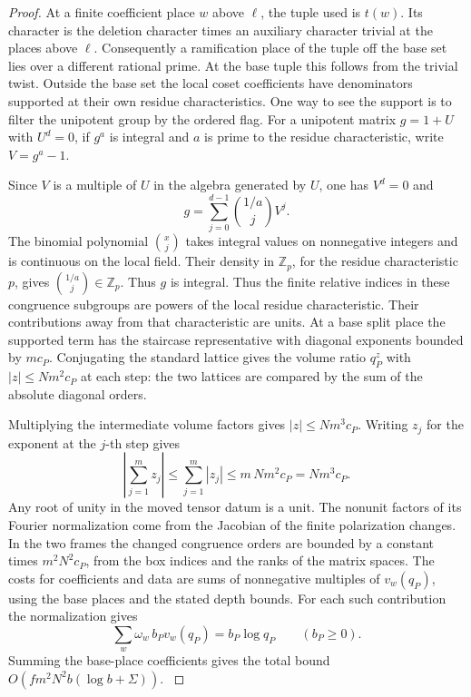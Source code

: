 \begin{proof}

At a finite coefficient place \(w\) above \(\ell\), the tuple
used is \(t(w)\). Its character is the deletion character times
an auxiliary character trivial at the places above \(\ell\).
Consequently a ramification place of the tuple off the base
set lies over a different rational prime. At the base tuple
this follows from the trivial twist. Outside the base set the
local coset coefficients have denominators supported at their
own residue characteristics. One way to see the support is to
filter the unipotent group by the ordered flag. For a unipotent
matrix \(g=1+U\) with \(U^d=0\), if \(g^a\) is integral and
\(a\) is prime to the residue characteristic, write \(V=g^a-1\).

Since \(V\) is a multiple of \(U\) in the
algebra generated by \(U\), one has \(V^d=0\) and
\[
        g=\sum_{j=0}^{d-1}\binom{1/a}{j}V^j .
\]
The binomial polynomial \(\binom{x}{j}\) takes integral values on
nonnegative integers and is continuous on the local field. Their
density in \(\mathbb Z_p\), for the residue characteristic \(p\),
gives \(\binom{1/a}{j}\in\mathbb Z_p\). Thus \(g\) is integral. Thus the finite relative
indices in these congruence subgroups are powers of the local
residue characteristic. Their contributions away from that
characteristic are units. At a base split place the supported
term has the staircase representative with diagonal exponents
bounded by \(mc_P\). Conjugating the standard lattice gives the
volume ratio \(q_P^z\) with \(|z|\le Nm^2c_P\) at each step:
the two lattices are compared by the sum of the absolute
diagonal orders.

Multiplying the intermediate volume factors
gives \(|z|\le Nm^3c_P\).
Writing \(z_j\) for the exponent at the \(j\)-th step gives
\[
  \left|\sum_{j=1}^{m} z_j\right|\le\sum_{j=1}^{m}|z_j|\le m\,Nm^2 c_P=Nm^3c_P .
\]
 Any root of unity in the moved
tensor datum is a unit. The nonunit factors of its Fourier
normalization come from the Jacobian of the finite polarization
changes. In the two frames the changed congruence orders are
bounded by a constant times \(m^2N^2c_P\), from the box
indices and the ranks of the matrix spaces. The costs for coefficients and data are sums of nonnegative
multiples of \(v_w(q_P)\), using the base places and the stated
depth bounds. For each such contribution the normalization gives
\[
 \sum_w\omega_w\,b_P v_w(q_P)=b_P\log q_P\qquad(b_P\ge0).
\]
Summing the base-place coefficients gives the total bound
\(O(fm^2N^2b(\log b+\Sigma))\).
\label{cor:fitted-evaluation-3}


\end{proof}
